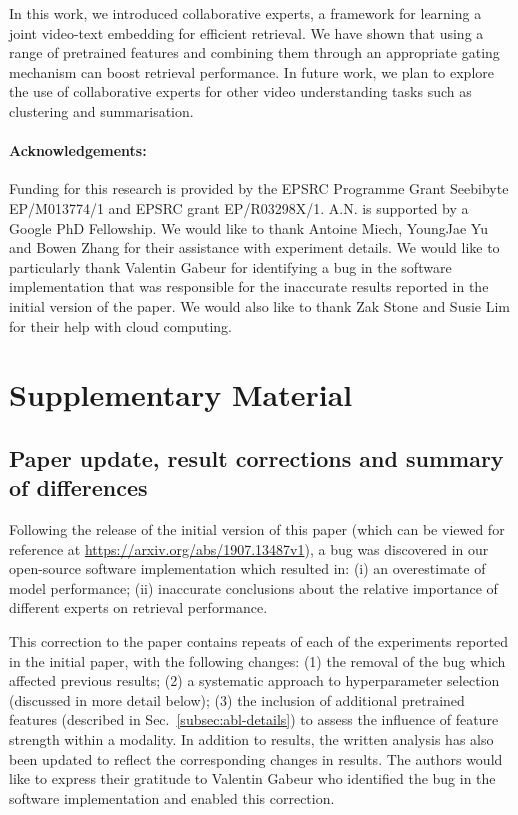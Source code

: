 \documentclass{bmvc2k}
\begin{document}
In this work, we introduced collaborative experts, a framework for learning a joint video-text embedding for efficient retrieval.  We have shown that using a range of pretrained features and combining them through an appropriate gating mechanism can boost retrieval performance. In future work, we plan to explore the use of collaborative experts for other video understanding tasks such as clustering and summarisation. 

\nopagebreak \noindent \paragraph{Acknowledgements:} Funding for this research is provided by the EPSRC Programme Grant Seebibyte EP/M013774/1 and EPSRC grant EP/R03298X/1. A.N. is supported by a Google PhD Fellowship. We would like to thank Antoine Miech, YoungJae Yu and Bowen Zhang for their assistance with experiment details.  We would like to particularly thank Valentin Gabeur for identifying a bug in the software implementation that was responsible for the inaccurate results reported in the initial version of the paper. We would also like to thank Zak Stone and Susie Lim for their help with cloud computing.  

\clearpage
{\small


}

\appendix
\section{Supplementary Material}

\subsection{Paper update, result corrections and summary of differences} \label{sec:correction}

Following the release of the initial version of this paper (which can be viewed for reference at \url{https://arxiv.org/abs/1907.13487v1}), a bug was discovered in our open-source software implementation which resulted in: (i) an overestimate of model performance; (ii) inaccurate conclusions about the relative importance of different experts on retrieval performance.  

This correction to the paper contains repeats of each of the experiments reported in the initial paper, with the following changes: (1) the removal of the bug which affected previous results; (2) a systematic approach to hyperparameter selection (discussed in more detail below); (3) the inclusion of additional  pretrained features (described in Sec.~\ref{subsec:abl-details}) to assess the influence of feature strength within a modality.  In addition to results, the written analysis has also been updated to reflect the corresponding changes in results.  The authors would like to express their gratitude to Valentin Gabeur who identified the bug in the software implementation and enabled this correction.
\end{document}
